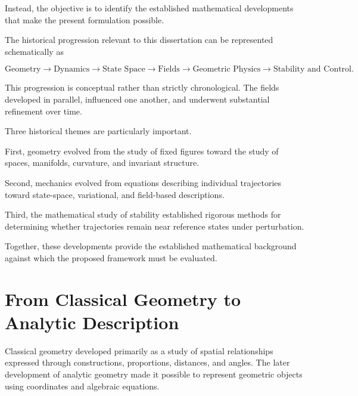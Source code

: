 \documentclass[12pt,oneside]{book}
\begin{document}
Instead, the objective is to identify the established
mathematical developments that make the present formulation
possible.

The historical progression relevant to this dissertation can be
represented schematically as

\begin{equation}
    \text{Geometry}
    \longrightarrow
    \text{Dynamics}
    \longrightarrow
    \text{State Space}
    \longrightarrow
    \text{Fields}
    \longrightarrow
    \text{Geometric Physics}
    \longrightarrow
    \text{Stability and Control}.
    \label{eq:historical-progression}
\end{equation}

This progression is conceptual rather than strictly
chronological. The fields developed in parallel, influenced one
another, and underwent substantial refinement over time.

Three historical themes are particularly important.

First, geometry evolved from the study of fixed figures toward
the study of spaces, manifolds, curvature, and invariant
structure.

Second, mechanics evolved from equations describing individual
trajectories toward state-space, variational, and field-based
descriptions.

Third, the mathematical study of stability established rigorous
methods for determining whether trajectories remain near
reference states under perturbation.

Together, these developments provide the established
mathematical background against which the proposed framework
must be evaluated.


\section{From Classical Geometry to Analytic Description}
\label{sec:classical-to-analytic-geometry}

Classical geometry developed primarily as a study of spatial
relationships expressed through constructions, proportions,
distances, and angles. The later development of analytic
geometry made it possible to represent geometric objects using
coordinates and algebraic equations.
\end{document}
